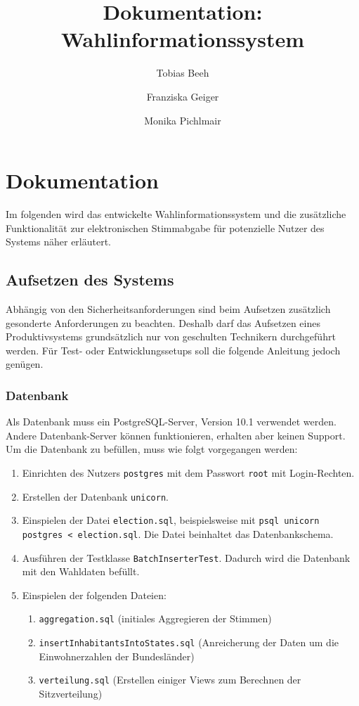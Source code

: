 \documentclass[a4paper]{scrreprt}
\begin{document}
 
\title{Dokumentation: Wahlinformationssystem}
\author{Tobias Beeh \and Franziska Geiger \and Monika Pichlmair}
\maketitle
 
\tableofcontents


\chapter{Dokumentation}

Im folgenden wird das entwickelte Wahlinformationssystem und die zusätzliche Funktionalität zur elektronischen Stimmabgabe für potenzielle Nutzer des Systems näher erläutert.

\section{Aufsetzen des Systems}

Abhängig von den Sicherheitsanforderungen sind beim Aufsetzen zusätzlich gesonderte Anforderungen zu beachten.
Deshalb darf das Aufsetzen eines Produktivsystems grundsätzlich nur von geschulten Technikern durchgeführt werden.
Für Test- oder Entwicklungssetups soll die folgende Anleitung jedoch genügen.

\subsection{Datenbank}

Als Datenbank muss ein PostgreSQL-Server, Version 10.1 verwendet werden. 
Andere Datenbank-Server können funktionieren, erhalten aber keinen Support.
Um die Datenbank zu befüllen, muss wie folgt vorgegangen werden:
\begin{enumerate}
	\item Einrichten des Nutzers \texttt{postgres} mit dem Passwort \texttt{root} mit Login-Rechten.
	\item Erstellen der Datenbank \texttt{unicorn}.
	\item Einspielen der Datei \texttt{election.sql}, beispielsweise mit \texttt{psql unicorn postgres < election.sql}. Die Datei beinhaltet das Datenbankschema.
	\item Ausführen der Testklasse \texttt{BatchInserterTest}. Dadurch wird die Datenbank mit den Wahldaten befüllt.
	\item Einspielen der folgenden Dateien:\begin{enumerate}
		\item \texttt{aggregation.sql} (initiales Aggregieren der Stimmen)
		\item \texttt{insertInhabitantsIntoStates.sql} (Anreicherung der Daten um die Einwohnerzahlen der Bundesländer)
		\item \texttt{verteilung.sql} (Erstellen einiger Views zum Berechnen der Sitzverteilung)
	\end{enumerate}
\end{enumerate}
\end{document}
